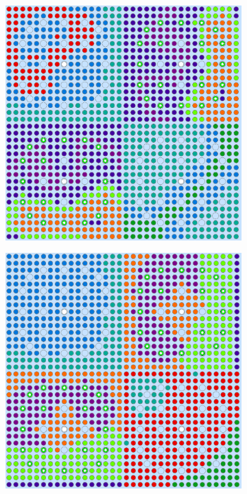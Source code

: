 \begin{appendices}
\begin{figure}[h!]
\begin{subfigure}{0.48\textwidth}
  \includegraphics[width=0.95\linewidth]{figures/unsupervised/geometries/dimension-reduce/reflector/pca}
  \caption{}
  \label{fig:refl-combined-pca-2}
\end{subfigure}
\begin{subfigure}{0.48\textwidth}
  \centering
  \includegraphics[width=0.95\linewidth]{figures/unsupervised/geometries/dimension-reduce/reflector/ica}

\end{subfigure}
\end{figure}
\end{appendices}
